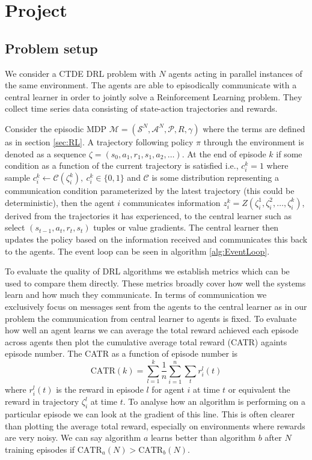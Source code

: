\chapter{Project}

\section{Problem setup}

We consider a CTDE DRL problem with $N$ agents acting in parallel instances of the same environment.
The agents are able to episodically communicate with a central learner in order to jointly solve a Reinforcement Learning problem.
They collect time series data consisting of state-action trajectories and rewards.

Consider the episodic MDP $\mathcal{M}= (\mathcal{S}^N, \mathcal{A}^N, \mathcal{P}, R,\gamma)$ where the terms are defined as in section \ref{sec:RL}.
A trajectory following policy $\pi$ through the environment is denoted as a sequence $\zeta = (s_0, a_1, r_1, s_1, a_2, \dots)$.
At the end of episode $k$ if some condition as a function of the current trajectory is satisfied i.e., $c^k_i=1$ where sample $c^k_i \leftarrow \mathcal{C}(\zeta^k_i), \ c^k_i \in \{0,1\}$ and $\mathcal{C}$ is some distribution representing a communication condition parameterized by the latest trajectory (this could be deterministic), then the agent $i$ communicates information $z^k_i=Z(\zeta^1_i,\zeta^2_i,\dots, \zeta^k_i)$, derived from the trajectories it has experienced, to the central learner such as select $(s_{t-1},a_t,r_t,s_t)$ tuples or value gradients.
The central learner then updates the policy based on the information received and communicates this back to the agents. 
The event loop can be seen in algorithm \ref{alg:EventLoop}.


To evaluate the quality of DRL algorithms we establish metrics which can be used to compare them directly. These metrics broadly cover how well the systems learn and how much they communicate. In terms of communication we exclusively focus on messages sent from the agents to the central learner as in our problem the communication from central learner to agents is fixed. To evaluate how well an agent learns we can average the total reward achieved each episode across agents then plot the cumulative average total reward (CATR) againts episode number. The CATR as a function of episode number is 
\begin{equation*}
    \text{CATR}(k) = \sum_{l=1}^k \frac{1}{n} \sum_{i=1}^n \sum_{t} r^l_i(t)
\end{equation*}
where $r^l_i(t)$ is the reward in episode $l$ for agent $i$ at time $t$ or equivalent the reward in trajectory $\zeta^l_i$ at time $t$.
To analyse how an algorithm is performing on a particular episode we can look at the gradient of this line.
This is often clearer than plotting the average total reward, especially on environments where rewards are very noisy.
We can say algorithm $a$ learns better than algorithm $b$ after $N$ training episodes if $\text{CATR}_a(N) > \text{CATR}_b(N)$.

